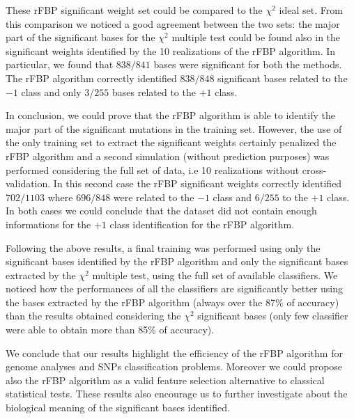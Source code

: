 \documentclass{standalone}
\begin{document}
These rFBP significant weight set could be compared to the $\chi^2$ ideal set.
From this comparison we noticed a good agreement between the two sets: the major part of the significant bases for the $\chi^2$ multiple test could be found also in the significant weights identified by the 10 realizations of the rFBP algorithm.
In particular, we found that $838/841$ bases were significant for both the methods.
The rFBP algorithm correctly identified $838/848$ significant bases related to the $-1$ class and only $3/255$ bases related to the $+1$ class.

In conclusion, we could prove that the rFBP algorithm is able to identify the major part of the significant mutations in the training set.
However, the use of the only training set to extract the significant weights certainly penalized the rFBP algorithm and a second simulation (without prediction purposes) was performed considering the full set of data, i.e 10 realizations without cross-validation.
In this second case the rFBP significant weights correctly identified $702/1103$ where $696/848$ were related to the $-1$ class and $6/255$ to the $+1$ class.
In both cases we could conclude that the dataset did not contain enough informations for the $+1$ class identification for the rFBP algorithm.

Following the above results, a final training was performed using only the significant bases identified by the rFBP algorithm and only the significant bases extracted by the $\chi^2$ multiple test, using the full set of available classifiers.
We noticed how the performances of all the classifiers are significantly better using the bases extracted by the rFBP algorithm (always over the 87\% of accuracy) than the results obtained considering the $\chi^2$ significant bases (only few classifier were able to obtain more than 85\% of accuracy).

We conclude that our results highlight the efficiency of the rFBP algorithm for genome analyses and SNPs classification problems.
Moreover we could propose also the rFBP algorithm as a valid feature selection alternative to classical statistical tests.
These results also encourage us to further investigate about the biological meaning of the significant bases identified.
\end{document}
